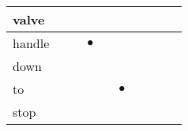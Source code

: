\documentclass[landscape]{article}
\newcommand{\ssp}{\hspace{2pt}}
\newcommand{\mex}{\cellcolor{g}$\bullet$}
\begin{document}
\begin{tabular}{|l|p{10pt}|p{10pt}|p{10pt}|p{10pt}|p{10pt}|p{10pt}|p{10pt}|p{10pt}|p{10pt}|}
\hline
\ssp valve \ssp&\hspace{2pt}&\hspace{2pt}&\hspace{2pt}&\hspace{2pt}&\hspace{2pt}&\hspace{2pt}&\hspace{2pt}&\hspace{2pt}&\hspace{2pt}\\
\hline
\ssp \cellcolor{ref2}handle \ssp&\hspace{2pt}&\hspace{2pt}&\hspace{2pt}\mex&\hspace{2pt}&\hspace{2pt}&\hspace{2pt}&\hspace{2pt}&\hspace{2pt}&\hspace{2pt}\\
\hline
\ssp down \ssp&\hspace{2pt}&\hspace{2pt}&\hspace{2pt}&\hspace{2pt}&\hspace{2pt}&\hspace{2pt}&\hspace{2pt}&\hspace{2pt}&\hspace{2pt}\\
\hline
\ssp \cellcolor{ref4}to \ssp&\hspace{2pt}&\hspace{2pt}&\hspace{2pt}&\hspace{2pt}&\hspace{2pt}\mex&\hspace{2pt}&\hspace{2pt}&\hspace{2pt}&\hspace{2pt}\\
\hline
\ssp stop \ssp&\hspace{2pt}&\hspace{2pt}&\hspace{2pt}&\hspace{2pt}&\hspace{2pt}&\hspace{2pt}&\hspace{2pt}&\hspace{2pt}&\hspace{2pt}\\

\end{tabular}
\end{document}
